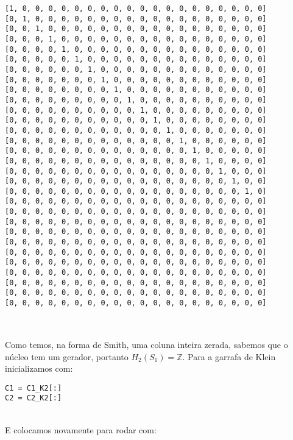\documentclass[12pt,a4paper]{article}
\theoremstyle{definition}
\begin{document}
\begin{lstlisting}[language=iPython]
[1, 0, 0, 0, 0, 0, 0, 0, 0, 0, 0, 0, 0, 0, 0, 0, 0, 0, 0, 0]
[0, 1, 0, 0, 0, 0, 0, 0, 0, 0, 0, 0, 0, 0, 0, 0, 0, 0, 0, 0]
[0, 0, 1, 0, 0, 0, 0, 0, 0, 0, 0, 0, 0, 0, 0, 0, 0, 0, 0, 0]
[0, 0, 0, 1, 0, 0, 0, 0, 0, 0, 0, 0, 0, 0, 0, 0, 0, 0, 0, 0]
[0, 0, 0, 0, 1, 0, 0, 0, 0, 0, 0, 0, 0, 0, 0, 0, 0, 0, 0, 0]
[0, 0, 0, 0, 0, 1, 0, 0, 0, 0, 0, 0, 0, 0, 0, 0, 0, 0, 0, 0]
[0, 0, 0, 0, 0, 0, 1, 0, 0, 0, 0, 0, 0, 0, 0, 0, 0, 0, 0, 0]
[0, 0, 0, 0, 0, 0, 0, 1, 0, 0, 0, 0, 0, 0, 0, 0, 0, 0, 0, 0]
[0, 0, 0, 0, 0, 0, 0, 0, 1, 0, 0, 0, 0, 0, 0, 0, 0, 0, 0, 0]
[0, 0, 0, 0, 0, 0, 0, 0, 0, 1, 0, 0, 0, 0, 0, 0, 0, 0, 0, 0]
[0, 0, 0, 0, 0, 0, 0, 0, 0, 0, 1, 0, 0, 0, 0, 0, 0, 0, 0, 0]
[0, 0, 0, 0, 0, 0, 0, 0, 0, 0, 0, 1, 0, 0, 0, 0, 0, 0, 0, 0]
[0, 0, 0, 0, 0, 0, 0, 0, 0, 0, 0, 0, 1, 0, 0, 0, 0, 0, 0, 0]
[0, 0, 0, 0, 0, 0, 0, 0, 0, 0, 0, 0, 0, 1, 0, 0, 0, 0, 0, 0]
[0, 0, 0, 0, 0, 0, 0, 0, 0, 0, 0, 0, 0, 0, 1, 0, 0, 0, 0, 0]
[0, 0, 0, 0, 0, 0, 0, 0, 0, 0, 0, 0, 0, 0, 0, 1, 0, 0, 0, 0]
[0, 0, 0, 0, 0, 0, 0, 0, 0, 0, 0, 0, 0, 0, 0, 0, 1, 0, 0, 0]
[0, 0, 0, 0, 0, 0, 0, 0, 0, 0, 0, 0, 0, 0, 0, 0, 0, 1, 0, 0]
[0, 0, 0, 0, 0, 0, 0, 0, 0, 0, 0, 0, 0, 0, 0, 0, 0, 0, 1, 0]
[0, 0, 0, 0, 0, 0, 0, 0, 0, 0, 0, 0, 0, 0, 0, 0, 0, 0, 0, 0]
[0, 0, 0, 0, 0, 0, 0, 0, 0, 0, 0, 0, 0, 0, 0, 0, 0, 0, 0, 0]
[0, 0, 0, 0, 0, 0, 0, 0, 0, 0, 0, 0, 0, 0, 0, 0, 0, 0, 0, 0]
[0, 0, 0, 0, 0, 0, 0, 0, 0, 0, 0, 0, 0, 0, 0, 0, 0, 0, 0, 0]
[0, 0, 0, 0, 0, 0, 0, 0, 0, 0, 0, 0, 0, 0, 0, 0, 0, 0, 0, 0]
[0, 0, 0, 0, 0, 0, 0, 0, 0, 0, 0, 0, 0, 0, 0, 0, 0, 0, 0, 0]
[0, 0, 0, 0, 0, 0, 0, 0, 0, 0, 0, 0, 0, 0, 0, 0, 0, 0, 0, 0]
[0, 0, 0, 0, 0, 0, 0, 0, 0, 0, 0, 0, 0, 0, 0, 0, 0, 0, 0, 0]
[0, 0, 0, 0, 0, 0, 0, 0, 0, 0, 0, 0, 0, 0, 0, 0, 0, 0, 0, 0]
[0, 0, 0, 0, 0, 0, 0, 0, 0, 0, 0, 0, 0, 0, 0, 0, 0, 0, 0, 0]
[0, 0, 0, 0, 0, 0, 0, 0, 0, 0, 0, 0, 0, 0, 0, 0, 0, 0, 0, 0]
 
\end{lstlisting}\ \\

Como temos, na forma de Smith, uma coluna inteira zerada, sabemos que o núcleo tem um gerador, portanto $H_2(S_1)=\mathbb{Z}$. Para a garrafa de Klein inicializamos com: \\ 

\begin{lstlisting}[language=iPython]
C1 = C1_K2[:]
C2 = C2_K2[:]
\end{lstlisting}\ \\

E colocamos novamente para rodar com: \\ 
\end{document}
